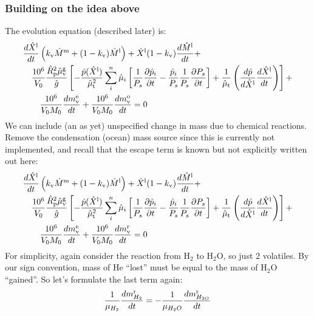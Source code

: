 \subsubsection{Building on the idea above}
The evolution equation (described later) is:
\begin{align}
&\frac{d \hat{X}^{\rm l}}{d t} \left(k_{\rm v} \hat{M}^{\rm m} + (1-k_{\rm v}) \hat{M}^{\rm l} \right)
+ \hat{X}^{\rm l} (1-k_{\rm v}) \frac{d \hat{M}^{\rm l}}{d t} + \nonumber \\
&\quad \frac{10^6}{V_0} \frac{\hat{R}_{\rm p}^2 \hat{\mu}_{\rm v}^{\rm g}}{\hat{g}}
\left[
-\frac{\hat{p}(\hat{X}^{\rm l})}{\hat{\mu}_{\rm t}^2} \sum_i^n \hat{\mu}_i \left[ \frac{1}{P_s} \frac{\partial \hat{p}_i}{\partial t} - \frac{\hat{p}_i}{P_s} \frac{1}{P_s} \frac{\partial P_s}{\partial t} \right] + \frac{1}{\hat{\mu}_{\rm t}} \left( \frac{d \hat{p}}{d \hat{X}^{\rm l}} \frac{d \hat{X}^{\rm l}}{d t} \right)
\right]+ \nonumber \\
& \qquad \frac{10^6}{V_0 M_0} \frac{dm_{\rm v}^{\rm e}}{dt} + \frac{10^6}{V_0 M_0} \frac{dm_{\rm v}^{\rm o}}{dt} = 0
\end{align}
We can include (an as yet) unspecified change in mass due to chemical reactions.  Remove the condensation (ocean) mass source since this is currently not implemented, and recall that the escape term is known but not explicitly written out here:
\begin{align}
&\frac{d \hat{X}^{\rm l}}{d t} \left(k_{\rm v} \hat{M}^{\rm m} + (1-k_{\rm v}) \hat{M}^{\rm l} \right)
+ \hat{X}^{\rm l} (1-k_{\rm v}) \frac{d \hat{M}^{\rm l}}{d t} + \nonumber \\
&\quad \frac{10^6}{V_0} \frac{\hat{R}_{\rm p}^2 \hat{\mu}_{\rm v}^{\rm g}}{\hat{g}}
\left[
-\frac{\hat{p}(\hat{X}^{\rm l})}{\hat{\mu}_{\rm t}^2} \sum_i^n \hat{\mu}_i \left[ \frac{1}{P_s} \frac{\partial \hat{p}_i}{\partial t} - \frac{\hat{p}_i}{P_s} \frac{1}{P_s} \frac{\partial P_s}{\partial t} \right] + \frac{1}{\hat{\mu}_{\rm t}} \left( \frac{d \hat{p}}{d \hat{X}^{\rm l}} \frac{d \hat{X}^{\rm l}}{d t} \right)
\right]+ \nonumber \\
& \qquad \frac{10^6}{V_0 M_0} \frac{dm_{\rm v}^{\rm e}}{dt} + \frac{10^6}{V_0 M_0} \frac{dm_{\rm v}^{\rm r}}{dt} = 0
\end{align}
For simplicity, again consider the reaction from H$_2$ to H$_2$O, so just 2 volatiles.  By our sign convention, mass of He ``lost'' must be equal to the mass of H$_2$O ``gained''.  So let's formulate the last term again:
\begin{equation}
\frac{1}{\mu_{H_2}} \frac{dm_{H_2}^{\rm r}}{dt} = - \frac{1}{\mu_{H_2O}} \frac{dm_{H_{2O}}^{\rm r}}{dt}
\end{equation}
